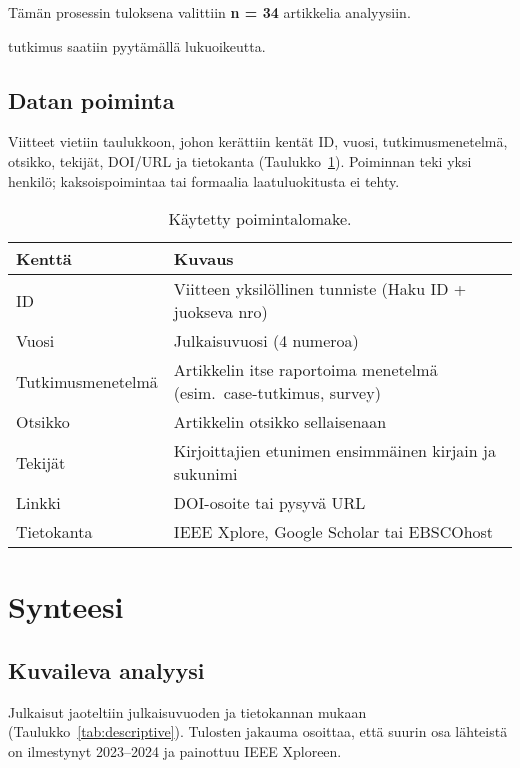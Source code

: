 \documentclass[bscthesis,finnish,oneside,biblatex]{uefcsthesis}
\begin{document}
Tämän prosessin tuloksena valittiin \textbf{n = 34} artikkelia analyysiin.

\cite{ozdenizci2024mobilizing} tutkimus saatiin pyytämällä lukuoikeutta.

\subsection{Datan poiminta}
\label{sec:data-extraction}

Viitteet vietiin taulukkoon, johon kerättiin kentät
ID, vuosi, tutkimusmenetelmä, otsikko, tekijät, DOI/URL ja tietokanta
(Taulukko~\ref{tab:extractionfields}). Poiminnan teki yksi henkilö;
kaksoispoimintaa tai formaalia laatuluokitusta ei tehty.


\begin{table}[htbp]
  \centering
  \footnotesize
  \caption{Käytetty poimintalomake.}
  \label{tab:extractionfields}
  \begin{tabular}{p{3cm}p{8.5cm}}
    \toprule
    \textbf{Kenttä} & \textbf{Kuvaus} \\
    \midrule
    ID           & Viitteen yksilöllinen tunniste (Haku ID + juokseva nro) \\
    Vuosi        & Julkaisuvuosi (4 numeroa) \\
    Tutkimus\-menetelmä & Artikkelin itse raportoima menetelmä (esim.\ case-tutkimus, survey) \\
    Otsikko      & Artikkelin otsikko sellaisenaan \\
    Tekijät      & Kirjoittajien etunimen ensimmäinen kirjain ja sukunimi \\
    Linkki       & DOI-osoite tai pysyvä URL \\
    Tietokanta   & IEEE Xplore, Google Scholar tai EBSCOhost \\
    \bottomrule
  \end{tabular}
\end{table}

\section{Synteesi}
\label{sec:synthesis}


\subsection{Kuvaileva analyysi}
Julkaisut jaoteltiin julkaisuvuoden ja tietokannan mukaan
(Taulukko~\ref{tab:descriptive}). Tulosten jakauma osoittaa, että
suurin osa lähteistä on ilmestynyt 2023–2024
ja painottuu IEEE Xploreen.
\end{document}
